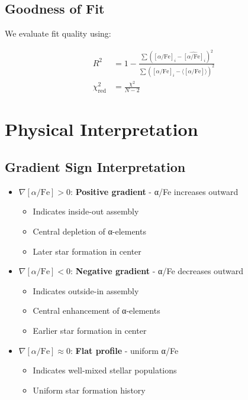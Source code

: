 \documentclass[11pt,a4paper]{article}
\begin{document}
\subsection{Goodness of Fit}

We evaluate fit quality using:

\begin{align}
R^2 &= 1 - \frac{\sum ([\alpha/\text{Fe}]_i - \hat{[\alpha/\text{Fe}]}_i)^2}{\sum ([\alpha/\text{Fe}]_i - \langle[\alpha/\text{Fe}]\rangle)^2} \\
\chi^2_\text{red} &= \frac{\chi^2}{N - 2}
\end{align}

\section{Physical Interpretation}

\subsection{Gradient Sign Interpretation}

\begin{itemize}
\item $\nabla[\alpha/\text{Fe}] > 0$: \textbf{Positive gradient} - α/Fe increases outward
  \begin{itemize}
  \item Indicates inside-out assembly
  \item Central depletion of α-elements
  \item Later star formation in center
  \end{itemize}
  
\item $\nabla[\alpha/\text{Fe}] < 0$: \textbf{Negative gradient} - α/Fe decreases outward
  \begin{itemize}
  \item Indicates outside-in assembly  
  \item Central enhancement of α-elements
  \item Earlier star formation in center
  \end{itemize}
  
\item $\nabla[\alpha/\text{Fe}] \approx 0$: \textbf{Flat profile} - uniform α/Fe
  \begin{itemize}
  \item Indicates well-mixed stellar populations
  \item Uniform star formation history
  \end{itemize}
\end{itemize}
\end{document}
